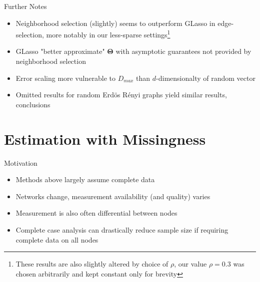\documentclass{beamer}
\begin{document}
\begin{frame}{Further Notes}
\begin{itemize}\setlength\itemsep{5mm}
    \item Neighborhood selection (slightly) seems to outperform GLasso in edge-selection, more notably in our less-sparse settings\footnote{These results are also slightly altered by choice of $\rho$, our value $\rho=0.3$ was chosen arbitrarily and kept constant only for brevity}
    \item GLasso "better approximate" $\boldsymbol\Theta$ with asymptotic guarantees not provided by neighborhood selection
    \item Error scaling more vulnerable to $D_{max}$ than $d$-dimensionalty of random vector 
    \item Omitted results for random Erd\"os R\'enyi graphs yield similar results, conclusions 
\end{itemize}    
\end{frame}


\section{Estimation with Missingness}

\begin{frame}{Motivation}
    \begin{itemize}\setlength\itemsep{6mm}
        \item Methods above largely assume complete data%
        \item Networks change, measurement availability (and quality) varies
        \item Measurement is also often differential between nodes 
        \item Complete case analysis can drastically reduce sample size if requiring complete data on all nodes 
    \end{itemize}
\end{frame}
\end{document}
